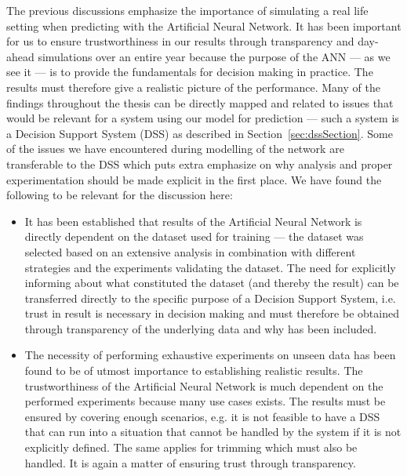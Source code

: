 The previous discussions emphasize the importance of simulating a real life setting when predicting with the Artificial Neural Network. It has been important for us to ensure trustworthiness in our results through transparency and day-ahead simulations over an entire year because the purpose of the ANN --- as we see it --- is to provide the fundamentals for decision making in practice. The results must therefore give a realistic picture of the performance. Many of the findings throughout the thesis can be directly mapped and related to issues that would be relevant for a system using our model for prediction --- such a system is a Decision Support System (DSS) as described in Section~\ref{sec:dssSection}. Some of the issues we have encountered during modelling of the network are transferable to the DSS which puts extra emphasize on why analysis and proper experimentation should be made explicit in the first place. We have found the following to be relevant for the discussion here:

\begin{itemize}
\item It has been established that results of the Artificial Neural Network is directly dependent on the dataset used for training --- the dataset was selected based on an extensive analysis in combination with different strategies and the experiments validating the dataset. The need for explicitly informing about what constituted the dataset (and thereby the result) can be transferred directly to the specific purpose of a Decision Support System, i.e. trust in result is necessary in decision making and must therefore be obtained through transparency of the underlying data and why has been included.
\item The necessity of performing exhaustive experiments on unseen data has been found to be of utmost importance to establishing realistic results. The trustworthiness of the Artificial Neural Network is much dependent on the performed experiments because many use cases exists. The results must be ensured by covering enough scenarios, e.g. it is not feasible to have a DSS that can run into a situation that cannot be handled by the system if it is not explicitly defined. The same applies for trimming which must also be handled. It is again a matter of ensuring trust through transparency.
\end{itemize}

